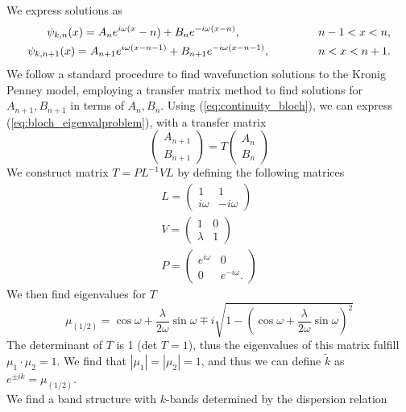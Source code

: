 %
We express solutions as
%
\begin{align}
\psi_{k,n}(x) = A_n e^{i\omega(x}-n) + B_n e^{-i\omega(x-n)},\hspace{16ex} n-1 < x < n,\\
\psi_{k,n+1}(x) = A_{n+1} e^{i\omega(x-n-1)} + B_{n+1} e^{-i\omega(x-n-1)}, \hspace{10ex} n < x < n+1.
\end{align}
%
We follow a standard procedure to find wavefunction solutions to the Kronig Penney model, employing a transfer matrix method to find solutions for $A_{n+1}, B_{n+1}$ in terms of $A_n, B_n$. Using (\ref{eq:continuity_bloch}), we can express (\ref{eq:bloch_eigenvalproblem}), with a transfer matrix
%
\begin{equation}
 \begin{pmatrix}
 A_{n+1} \\ B_{n+1}
 \end{pmatrix}
 = T 
 \begin{pmatrix}
 A_n \\ B_n
 \end{pmatrix}
\end{equation}{}
%
We construct matrix $T=PL^{-1}VL$ by defining the following matrices 
%
\begin{align}
L = \begin{pmatrix}
1 & 1 \\
i\omega & -i\omega
\end{pmatrix} \\
%
V = \begin{pmatrix}
1 & 0 \\
\lambda & 1
\end{pmatrix} \\
%
P = \begin{pmatrix}
e^{i\omega} & 0 \\
0 & e^{-i\omega}.
\end{pmatrix}
\end{align} 
%
We then find eigenvalues for $T$
\begin{equation}
    \mu_{(1/2)} = \cos{\omega} + \frac{\lambda}{2\omega}\sin{\omega}\mp i \sqrt{1-\left(\cos{\omega} + \frac{\lambda}{2\omega}\sin{\omega}\right)^2}
\end{equation}
%
The determinant of $T$ is 1 (det $T = 1$), thus the eigenvalues of this matrix fulfill $\mu_1 \cdot \mu_2 = 1$. We find that $|\mu_1| = |\mu_2|=1$, and thus we can define $\tilde{k}$ as $e^{\pm ik} = \mu_{(1/2)}$.\\
We find a band structure with $k$-bands determined by the dispersion relation
